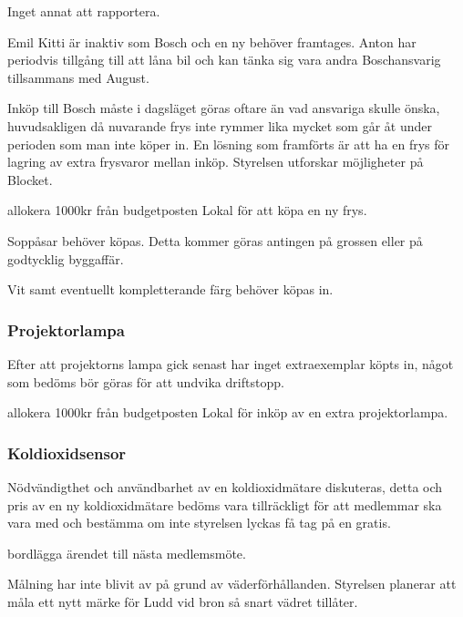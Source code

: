 \documentclass{protokoll}
\begin{document}
Inget annat att rapportera.

Emil Kitti är inaktiv som Bosch och en ny behöver framtages. Anton har periodvis tillgång till att låna bil och kan tänka sig vara andra Boschansvarig tillsammans med August. 


Inköp till Bosch måste i dagsläget göras oftare än vad ansvariga skulle önska, huvudsakligen då nuvarande frys inte rymmer lika mycket som går åt under perioden som man inte köper in. En lösning som framförts är att ha en frys för lagring av extra frysvaror mellan inköp. Styrelsen utforskar möjligheter på Blocket. 
\begin{beslut}
    \att allokera 1000kr från budgetposten Lokal för att köpa en ny frys.
\end{beslut}

Soppåsar behöver köpas. Detta kommer göras antingen på grossen eller på godtycklig byggaffär.

Vit samt eventuellt kompletterande färg behöver köpas in. 


\subsubsection{Projektorlampa}
Efter att projektorns lampa gick senast har inget extraexemplar köpts in, något som bedöms bör göras för att undvika driftstopp. 
\begin{beslut}
    \att allokera 1000kr från budgetposten Lokal för inköp av en extra projektorlampa.
\end{beslut}

\subsubsection{Koldioxidsensor}
Nödvändigthet och användbarhet av en koldioxidmätare diskuteras, detta och pris av en ny koldioxidmätare bedöms vara tillräckligt för att medlemmar ska vara med och bestämma om inte styrelsen lyckas få tag på en gratis. 
\begin{beslut}
    \att bordlägga ärendet till nästa medlemsmöte.
\end{beslut}

Målning har inte blivit av på grund av väderförhållanden. Styrelsen planerar att måla ett nytt märke för Ludd vid bron så snart vädret tillåter.
\end{document}
